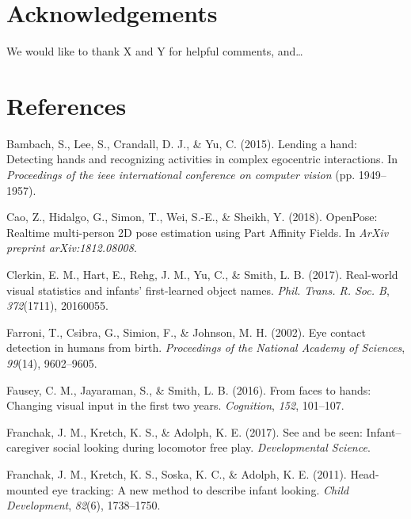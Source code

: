 \documentclass[10pt, letterpaper]{article}
\begin{document}
\section{Acknowledgements}\label{acknowledgements}

We would like to thank X and Y for helpful comments, and\ldots{}

\section{References}\label{references}

\setlength{\parindent}{-0.1in} \setlength{\leftskip}{0.125in} \noindent

\hypertarget{refs}{}
\hypertarget{ref-bambach2015lending}{}
Bambach, S., Lee, S., Crandall, D. J., \& Yu, C. (2015). Lending a hand:
Detecting hands and recognizing activities in complex egocentric
interactions. In \emph{Proceedings of the ieee international conference
on computer vision} (pp. 1949--1957).

\hypertarget{ref-Cao2018openpose}{}
Cao, Z., Hidalgo, G., Simon, T., Wei, S.-E., \& Sheikh, Y. (2018).
OpenPose: Realtime multi-person 2D pose estimation using Part Affinity
Fields. In \emph{ArXiv preprint arXiv:1812.08008}.

\hypertarget{ref-clerkin2017}{}
Clerkin, E. M., Hart, E., Rehg, J. M., Yu, C., \& Smith, L. B. (2017).
Real-world visual statistics and infants' first-learned object names.
\emph{Phil. Trans. R. Soc. B}, \emph{372}(1711), 20160055.

\hypertarget{ref-Farroni2002}{}
Farroni, T., Csibra, G., Simion, F., \& Johnson, M. H. (2002). Eye
contact detection in humans from birth. \emph{Proceedings of the
National Academy of Sciences}, \emph{99}(14), 9602--9605.

\hypertarget{ref-Fausey2016}{}
Fausey, C. M., Jayaraman, S., \& Smith, L. B. (2016). From faces to
hands: Changing visual input in the first two years. \emph{Cognition},
\emph{152}, 101--107.

\hypertarget{ref-franchak2017see}{}
Franchak, J. M., Kretch, K. S., \& Adolph, K. E. (2017). See and be
seen: Infant--caregiver social looking during locomotor free play.
\emph{Developmental Science}.

\hypertarget{ref-franchak2011}{}
Franchak, J. M., Kretch, K. S., Soska, K. C., \& Adolph, K. E. (2011).
Head-mounted eye tracking: A new method to describe infant looking.
\emph{Child Development}, \emph{82}(6), 1738--1750.
\end{document}
